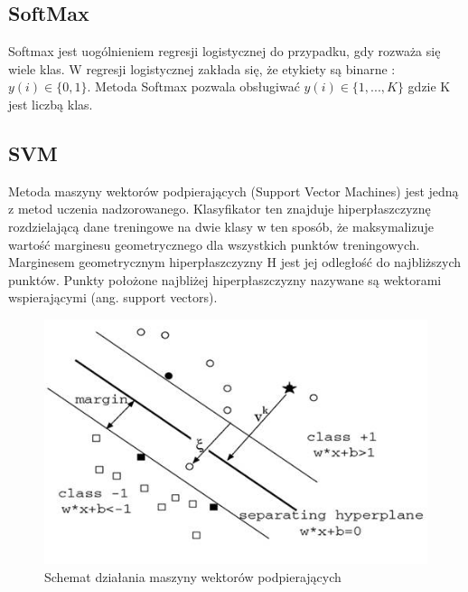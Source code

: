 \documentclass{article}
\begin{document}
\subsection{SoftMax}
Softmax jest uogólnieniem regresji logistycznej do przypadku, gdy rozważa się wiele klas. W regresji logistycznej zakłada się, że etykiety są binarne : $y(i) \in \{0,1\}$. Metoda Softmax pozwala obsługiwać $y(i) \in \{1, ..., K\}$ gdzie K jest liczbą klas.
\subsection{SVM}
Metoda maszyny wektorów podpierających (Support Vector Machines) jest jedną z metod uczenia nadzorowanego. Klasyfikator ten znajduje hiperpłaszczyznę rozdzielającą dane treningowe na dwie klasy w ten sposób, że maksymalizuje wartość marginesu geometrycznego dla wszystkich punktów treningowych. Marginesem geometrycznym hiperpłaszczyzny H jest jej odległość do najbliższych punktów. Punkty położone najbliżej hiperpłaszczyzny nazywane są wektorami wspierającymi (ang. support vectors).
\begin{figure}[htp]
	\centering
	\includegraphics[width=1\textwidth]{Figures/svm.jpg}
	\caption{Schemat działania maszyny wektorów podpierających }
\end{figure}
\end{document}
